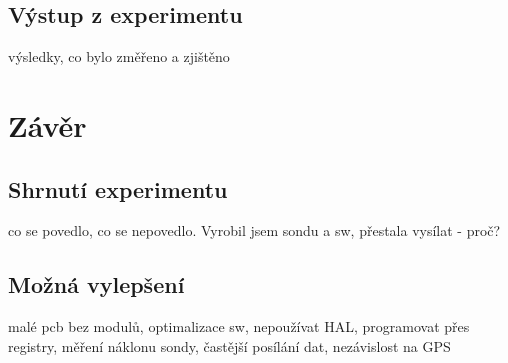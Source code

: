 \documentclass[twoside]{ctuthesis}
\theoremstyle{plain}
\theoremstyle{definition}
\theoremstyle{note}
\begin{document}
	\section{Výstup z experimentu}
	výsledky, co bylo změřeno a zjištěno



\chapter{Závěr}
	\section{Shrnutí experimentu}
	co se povedlo, co se nepovedlo. Vyrobil jsem sondu a sw, přestala vysílat - proč? 

	\section{Možná vylepšení}
	malé pcb bez modulů, optimalizace sw, nepoužívat HAL, programovat přes registry, měření náklonu sondy, častější posílání dat, nezávislost na GPS




\appendix

\printindex

\appendix




\end{document}
